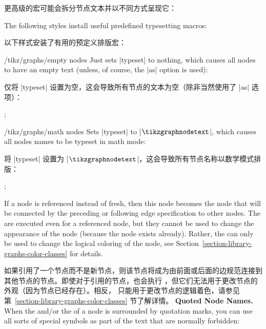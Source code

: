 \begin{itemize}
        更高级的宏可能会拆分节点文本并以不同方式呈现它：
        The following styles install useful predefined typesetting macros:
        
        以下样式安装了有用的预定义排版宏：
        \begin{key}{/tikz/graphs/empty nodes}
            Just sets |typeset| to nothing, which causes all nodes to have an
            empty text (unless, of course, the |as| option is used):
            
            仅将 |typeset| 设置为空，这会导致所有节点的文本为空（除非当然使用了 |as| 选项）：
\begin{codeexample}[preamble={\usetikzlibrary{graphs}}]
\tikz {};
\end{codeexample}
        \end{key}
        \begin{key}{/tikz/graphs/math nodes}
            Sets |typeset| to |$\tikzgraphnodetext$|, which causes all nodes
            names to be typeset in math mode:
            
            将 |typeset| 设置为 |$\tikzgraphnodetext$|，这会导致所有节点名称以数学模式排版：
\begin{codeexample}[preamble={\usetikzlibrary{graphs}}]
\tikz {};
\end{codeexample}
        \end{key}
\end{itemize}

If a node is referenced instead of fresh, then this node becomes the node that
will be connected by the preceding or following edge specification to other
nodes. The  are executed even for a referenced node, but they
cannot be used to change the appearance of the node (because the node exists
already). Rather, the  can only be used to change the logical
coloring of the node, see Section~\ref{section-library-graphs-color-classes}
for details.

如果引用了一个节点而不是新节点，则该节点将成为由前面或后面的边规范连接到其他节点的节点。即使对于引用的节点，也会执行 ，但它们无法用于更改节点的外观（因为节点已经存在）。相反， 只能用于更改节点的逻辑着色，请参见第~\ref{section-library-graphs-color-classes} 节了解详情。
\medskip
\textbf{Quoted Node Names.} When the  and/or the  of
a node is surrounded by quotation marks, you can use all sorts of special
symbols as part of the text that are normally forbidden:

